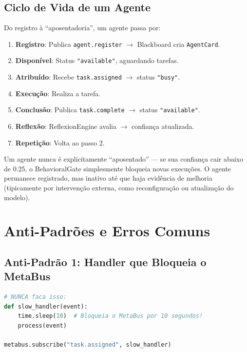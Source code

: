 \subsection{Ciclo de Vida de um Agente}

Do registro à ``aposentadoria'', um agente passa por:

\begin{enumerate}
    \item \textbf{Registro}: Publica \texttt{agent.register} $\rightarrow$ Blackboard cria \texttt{AgentCard}.
    \item \textbf{Disponível}: Status \texttt{"available"}, aguardando tarefas.
    \item \textbf{Atribuído}: Recebe \texttt{task.assigned} $\rightarrow$ status \texttt{"busy"}.
    \item \textbf{Execução}: Realiza a tarefa.
    \item \textbf{Conclusão}: Publica \texttt{task.complete} $\rightarrow$ status \texttt{"available"}.
    \item \textbf{Reflexão}: ReflexionEngine avalia $\rightarrow$ confiança atualizada.
    \item \textbf{Repetição}: Volta ao passo 2.
\end{enumerate}

Um agente nunca é explicitamente ``aposentado'' — se sua confiança cair abaixo de 0.25, o BehavioralGate simplesmente bloqueia novas execuções. O agente permanece registrado, mas inativo até que haja evidência de melhoria (tipicamente por intervenção externa, como reconfiguração ou atualização do modelo).

\section{Anti-Padrões e Erros Comuns}
\label{sec:antipatterns}

\subsection{Anti-Padrão 1: Handler que Bloqueia o MetaBus}

\begin{lstlisting}[language=Python, caption={ANTI-PADRÃO: Handler lento bloqueia o despacho}, label={lst:antipattern-blocking}]
# NUNCA faca isso:
def slow_handler(event):
    time.sleep(10)  # Bloqueia o MetaBus por 10 segundos!
    process(event)

metabus.subscribe("task.assigned", slow_handler)
\end{lstlisting}

